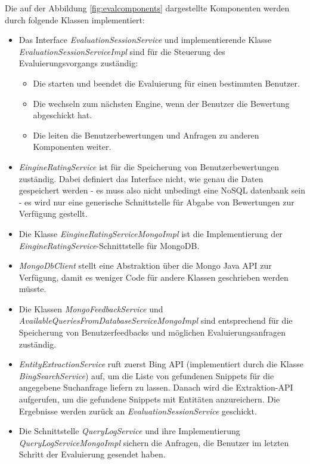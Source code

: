 Die auf der Abbildung \ref{fig:evalcomponents} dargestellte Komponenten werden durch folgende Klassen implementiert:
\begin{itemize}
\item Das Interface \textit{EvaluationSessionService} und implementierende Klasse \textit{EvaluationSessionServiceImpl} sind für die Steuerung des Evaluierungsvorgangs zuständig:
\begin{itemize}
\item Die starten und beendet die Evaluierung für einen bestimmten Benutzer.
\item Die wechseln zum nächsten Engine, wenn der Benutzer die Bewertung abgeschickt hat.
\item Die leiten die Benutzerbewertungen und Anfragen zu anderen Komponenten weiter.
\end{itemize}
\item \textit{EingineRatingService} ist für die Speicherung von Benutzerbewertungen zuständig. Dabei definiert das Interface nicht, wie genau die Daten gespeichert werden - es muss also nicht unbedingt eine NoSQL datenbank sein - es wird nur eine generische Schnittstelle für Abgabe von Bewertungen zur Verfügung gestellt.
\item Die Klasse \textit{EingineRatingServiceMongoImpl} ist die Implementierung der \textit{EingineRatingService}-Schnittstelle für MongoDB.
\item \textit{MongoDbClient} stellt eine Abstraktion über die Mongo Java API zur Verfügung, damit es weniger Code für andere Klassen geschrieben werden müsste.
\item Die Klassen \textit{MongoFeedbackService} und \textit{AvailableQueriesFromDatabaseServiceMongoImpl} sind entsprechend für die Speicherung von Benutzerfeedbacks und möglichen Evaluierungsanfragen zuständig. 
\item \textit{EntityExtractionService} ruft zuerst Bing API (implementiert durch die Klasse \textit{BingSearchService}) auf, um die Liste von gefundenen Snippets für die angegebene Suchanfrage liefern zu lassen. Danach wird die Extraktion-API aufgerufen, um die gefundene Snippets mit Entitäten anzureichern. Die Ergebnisse werden zurück an \textit{EvaluationSessionService} geschickt.
\item Die Schnittstelle \textit{QueryLogService} und ihre Implementierung \textit{QueryLogServiceMongoImpl} sichern die Anfragen, die Benutzer im letzten Schritt der Evaluierung gesendet haben.
\end{itemize}

